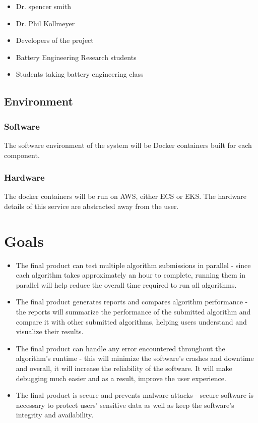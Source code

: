 \documentclass{article}
\begin{document}
\begin{itemize}
    \item Dr. spencer smith
    \item Dr. Phil Kollmeyer
    \item Developers of the project
    \item Battery Engineering Research students
    \item Students taking battery engineering class
\end{itemize}

\subsection{Environment}

\subsubsection{Software}
The software environment of the system will be Docker containers built for each component.

\subsubsection{Hardware}
The docker containers will be run on AWS, either ECS or EKS. The hardware details of this service are abstracted away from the user.

\section{Goals}

\begin{itemize}
    \item The final product can test multiple algorithm submissions in parallel - since each algorithm takes approximately an hour to complete, running them in parallel will help reduce the overall time required to run all algorithms.
    \item The final product generates reports and compares algorithm performance - the reports will summarize the performance of the submitted algorithm and compare it with other submitted algorithms, helping users understand and visualize their results.
    \item The final product can handle any error encountered throughout the algorithm’s runtime - this will minimize the software’s crashes and downtime and overall, it will increase the reliability of the software. It will make debugging much easier and as a result, improve the user experience.
    \item The final product is secure and prevents malware attacks - secure software is necessary to protect users’ sensitive data as well as keep the software’s integrity and availability.
\end{itemize}
\end{document}
